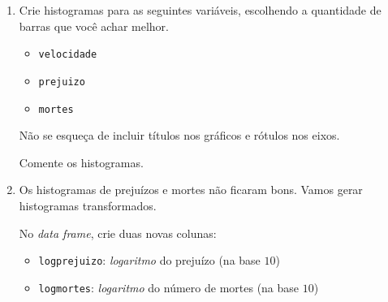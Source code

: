 \documentclass[
  11pt]{report}
\begin{document}
\begin{enumerate}
\def\labelenumi{\arabic{enumi}.}
\item
  Crie histogramas para as seguintes variáveis, escolhendo a quantidade de barras que você achar melhor.

  \begin{itemize}
  \item
    \texttt{velocidade}
  \item
    \texttt{prejuizo}
  \item
    \texttt{mortes}
  \end{itemize}

  Não se esqueça de incluir títulos nos gráficos e rótulos nos eixos.

  Comente os histogramas.
\item
  Os histogramas de prejuízos e mortes não ficaram bons. Vamos gerar histogramas transformados.

  No \emph{data frame}, crie duas novas colunas:

  \begin{itemize}
  \item
    \texttt{logprejuizo}: \emph{logaritmo} do prejuízo (na base $10$)
  \item
    \texttt{logmortes}: \emph{logaritmo} do número de mortes (na base $10$)
  \end{itemize}


\end{enumerate}
\end{document}
